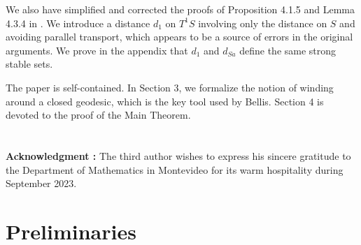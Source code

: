 \documentclass[a4paper,english,reqno]{amsart}
\newcommand{\R}{\mathbb{R}}
\renewcommand{\H}{\mathbb{H}}
\newcommand{\N}{\mathbb{N}} %
\newtheorem*{theoremB*}{Main Theorem for a Flute}
\theoremstyle{definition}
\numberwithin{equation}{section}
\begin{document}
	We also have simplified and corrected the proofs of Proposition 4.1.5 and Lemma 4.3.4 in \cite{Bellis}. We introduce a distance $d_1$ on $T^1S$ involving only the distance on $S$ and avoiding parallel transport, which appears to be a source of errors in the original arguments. We prove in the appendix that $d_1$ and $d_{Sa}$ define the same strong stable sets.
	
	The paper is self-contained. In Section 3, we formalize the notion of winding around a closed geodesic, which is the key tool used by Bellis. Section 4 is devoted to the proof of the Main Theorem.
	
	
	
	\maketitle
		
%	
	\section*{}
	\textbf{Acknowledgment :} The third author wishes to express his sincere gratitude to the Department of Mathematics in Montevideo for its warm hospitality during September 2023.
		
		
	
	
	
	

\section{Preliminaries}
\end{document}
